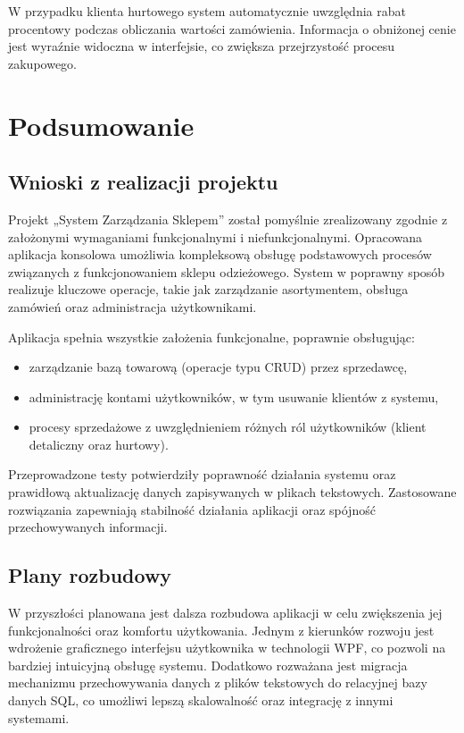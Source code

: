\documentclass[a4paper,12pt]{report}
\begin{document}
W przypadku klienta hurtowego system automatycznie uwzględnia rabat procentowy podczas obliczania wartości zamówienia. Informacja o obniżonej cenie jest wyraźnie widoczna w interfejsie, co zwiększa przejrzystość procesu zakupowego.

\chapter{Podsumowanie}

\section{Wnioski z realizacji projektu}
Projekt „System Zarządzania Sklepem” został pomyślnie zrealizowany zgodnie z założonymi wymaganiami funkcjonalnymi i niefunkcjonalnymi. Opracowana aplikacja konsolowa umożliwia kompleksową obsługę podstawowych procesów związanych z funkcjonowaniem sklepu odzieżowego. System w poprawny sposób realizuje kluczowe operacje, takie jak zarządzanie asortymentem, obsługa zamówień oraz administracja użytkownikami.

Aplikacja spełnia wszystkie założenia funkcjonalne, poprawnie obsługując:
\begin{itemize}
    \item zarządzanie bazą towarową (operacje typu CRUD) przez sprzedawcę,
    \item administrację kontami użytkowników, w tym usuwanie klientów z systemu,
    \item procesy sprzedażowe z uwzględnieniem różnych ról użytkowników (klient detaliczny oraz hurtowy).
\end{itemize}

Przeprowadzone testy potwierdziły poprawność działania systemu oraz prawidłową aktualizację danych zapisywanych w plikach tekstowych. Zastosowane rozwiązania zapewniają stabilność działania aplikacji oraz spójność przechowywanych informacji.

\section{Plany rozbudowy}
W przyszłości planowana jest dalsza rozbudowa aplikacji w celu zwiększenia jej funkcjonalności oraz komfortu użytkowania. Jednym z kierunków rozwoju jest wdrożenie graficznego interfejsu użytkownika w technologii WPF, co pozwoli na bardziej intuicyjną obsługę systemu. Dodatkowo rozważana jest migracja mechanizmu przechowywania danych z plików tekstowych do relacyjnej bazy danych SQL, co umożliwi lepszą skalowalność oraz integrację z innymi systemami.
\end{document}
